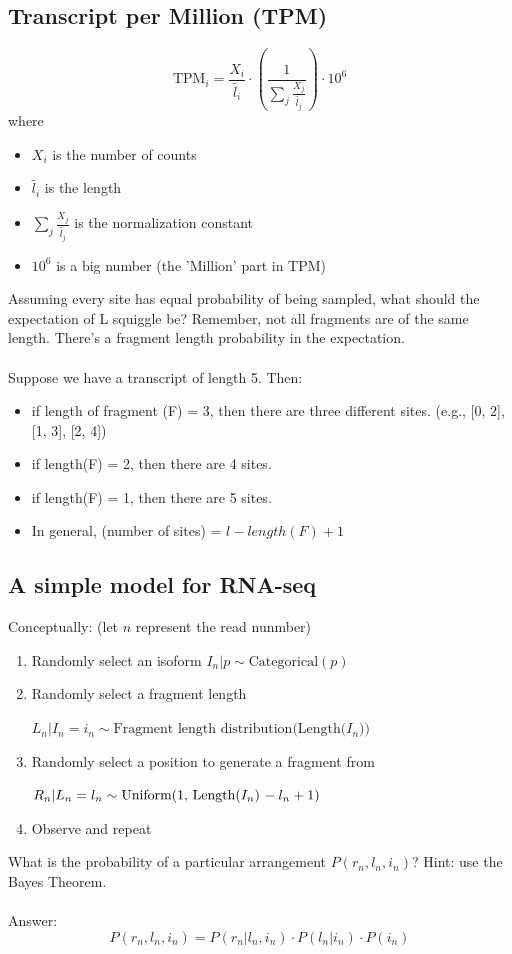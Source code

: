 \documentclass[10pt]{article}
\begin{document}
\subsection*{Transcript per Million (TPM)}
\[\text{TPM}_i = \frac{X_i}{\tilde{l_i}} \cdot \left(\frac{1}{\sum_j \frac{X_j}{\tilde{l_j}}}\right) \cdot 10^6\]
where 
\begin{itemize}
    \item $X_i$ is the number of counts
    \item $\tilde{l_i}$ is the length
    \item $\sum_j \frac{X_j}{\tilde{l_j}}$ is the normalization constant
    \item $10^6$ is a big number (the 'Million' part in TPM)
\end{itemize}
Assuming every site has equal probability of being sampled, what should the expectation of L squiggle be?  Remember, not all fragments are of the same length.  There's a fragment length probability in the expectation.\\\\
Suppose we have a transcript of length 5.  Then:
\begin{itemize}
    \item if length of fragment (F) = 3, then there are three different sites.  (e.g., [0, 2], [1, 3], [2, 4])
    \item if length(F) = 2, then there are 4 sites.
    \item if length(F) = 1, then there are 5 sites.
    \item In general, (number of sites) = $l - length(F) + 1$
\end{itemize}

\subsection*{A simple model for RNA-seq}
Conceptually:  \hfill (let $n$ represent the read nunmber)
\begin{enumerate}[~~~~1.]
    \item Randomly select an isoform \hfill $I_n \vert p \sim \text{Categorical}(p)$
    \item Randomly select a fragment length
    \begin{flushright}\vspace{-0.2cm}$L_n \vert I_n = i_n \sim \text{Fragment length distribution(Length($I_n$))}$\end{flushright}
    \item \vspace{-0.2cm} Randomly select a position to generate a fragment from
    \begin{flushright}\vspace{-0.2cm}$R_n \vert L_n = l_n \sim \text{Uniform(1, Length($I_n$) $ -\:l_n + 1$)}$\end{flushright}
    \item \vspace{-0.2cm} Observe and repeat
\end{enumerate}
What is the probability of a particular arrangement $P(r_n, l_n, i_n)$?  Hint: use the Bayes Theorem.\\\\
Answer:
\[P(r_n, l_n, i_n) = P(r_n \vert l_n, i_n) \cdot P(l_n \vert i_n) \cdot P(i_n)\]
\end{document}
